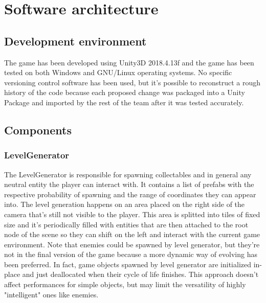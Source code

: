 \documentclass[11pt]{article}
\begin{document}
\section{Software architecture}
\subsection{Development environment}
The game has been developed using Unity3D 2018.4.13f and the game has been tested on both Windows and GNU/Linux operating systems. No specific versioning control software has been used, but it's possible to reconstruct a rough history of the code because each proposed change was packaged into a Unity Package and imported by the rest of the team after it was tested accurately.

\subsection{Components}
\subsubsection{LevelGenerator}
The LevelGenerator is responsible for spawning collectables and in general any neutral entity the player can interact with.
It contains a list of prefabs with the respective probability of spawning and the range of coordinates they can appear into.
The level generation happens on an area placed on the right side of the camera that's still not visible to the player.
This area is splitted into tiles of fixed size and it's periodically filled with entities that are then attached to the root node of the scene so they can shift on the left and interact with the current game environment.
Note that enemies could be spawned by level generator, but they're not in the final version of the game because a more dynamic way of evolving has been preferred. In fact, game objects spawned by level generator are initialized in-place and just deallocated when their cycle of life finishes. This approach doesn't affect performances for simple objects, but may limit the versatility of highly "intelligent" ones like enemies.
\end{document}
